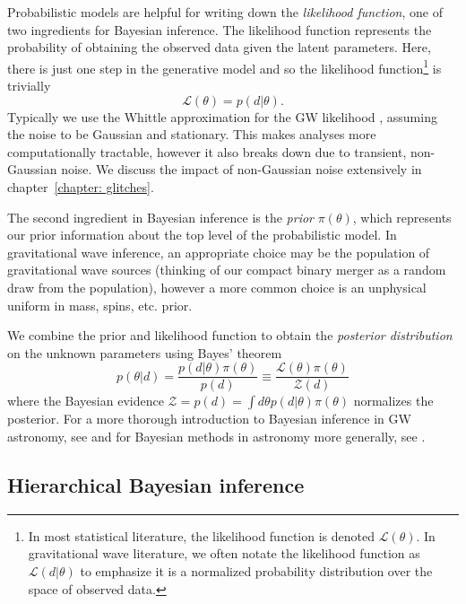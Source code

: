 \begin{refsection}
Probabilistic models are helpful for writing down the \textit{likelihood function}, one of two ingredients for Bayesian inference. The likelihood function represents the probability of obtaining the observed data given the latent parameters. Here, there is just one step in the generative model and so the likelihood function\footnote{In most statistical literature, the likelihood function is denoted $\mathcal{L}(\theta)$. In gravitational wave literature, we often notate the likelihood function as $\mathcal{L}(d|\theta)$ to emphasize it is a normalized probability distribution over the space of observed data.} is trivially 
\begin{equation}
    \mathcal{L}(\theta) = p(d | \theta).
\end{equation}
Typically we use the Whittle approximation for the \ac{GW} likelihood \citep{whittle1951hypothesis, Cutler:1994ys}, assuming the noise to be Gaussian and stationary. This makes analyses more computationally tractable, however it also breaks down due to transient, non-Gaussian noise. We discuss the impact of non-Gaussian noise extensively in chapter~\ref{chapter: glitches}.

The second ingredient in Bayesian inference is the \textit{prior} $\pi(\theta)$, which represents our prior information about the top level of the probabilistic model. In gravitational wave inference, an appropriate choice may be the population of gravitational wave sources (thinking of our compact binary merger as a random draw from the population), however a more common choice is an unphysical uniform in mass, spins, etc. prior.

We combine the prior and likelihood function to obtain the \textit{posterior distribution} on the unknown parameters using Bayes' theorem 
\begin{equation}
    p(\theta | d) = \frac{p(d|\theta)\pi(\theta)}{p(d)} \equiv \frac{\mathcal{L}(\theta)\pi(\theta)}{\mathcal{Z}(d)}
\end{equation}
where the Bayesian evidence $\mathcal{Z} = p(d) = \int d\theta p(d|\theta)\pi(\theta)$ normalizes the posterior. For a more thorough introduction to Bayesian inference in \ac{GW} astronomy, see \citet{Thrane:2018qnx} and for Bayesian methods in astronomy more generally, see \citet{Loredo:2004nn}.

\subsection{Hierarchical Bayesian inference}


\end{refsection}
